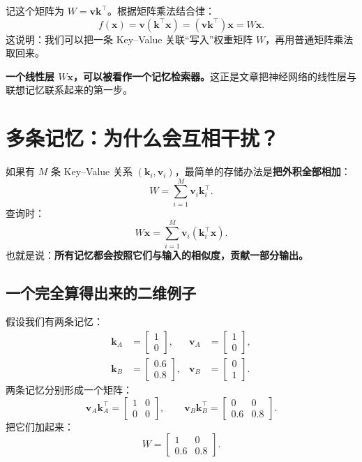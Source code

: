 \documentclass[11pt,a4paper,UTF8]{ctexart}
\numberwithin{equation}{section}
\newcommand{\vect}[1]{\boldsymbol{#1}}
\begin{document}
记这个矩阵为 $W=\vect{v}\vect{k}^\top$。根据矩阵乘法结合律：
\begin{equation}
\boxed{f(\vect{x})=\vect{v}(\vect{k}^\top\vect{x})=(\vect{v}\vect{k}^\top)\vect{x}=W\vect{x}.}
\end{equation}
这说明：我们可以把一条 Key--Value 关联“写入”权重矩阵 $W$，再用普通矩阵乘法取回来。

\begin{idea}
\textbf{一个线性层 $W\vect{x}$，可以被看作一个记忆检索器。}这正是文章把神经网络的线性层与联想记忆联系起来的第一步。
\end{idea}

\section{多条记忆：为什么会互相干扰？}

如果有 $M$ 条 Key--Value 关系 $(\vect{k}_i,\vect{v}_i)$，最简单的存储办法是\textbf{把外积全部相加}：
\begin{equation}
\boxed{W=\sum_{i=1}^{M}\vect{v}_i\vect{k}_i^\top.}
\end{equation}
查询时：
\begin{equation}
\boxed{W\vect{x}=\sum_{i=1}^{M}\vect{v}_i(\vect{k}_i^\top\vect{x}).}
\end{equation}
也就是说：\textbf{所有记忆都会按照它们与输入的相似度，贡献一部分输出。}

\subsection{一个完全算得出来的二维例子}
假设我们有两条记忆：
\begin{align*}
\vect{k}_A&=\begin{bmatrix}1\\0\end{bmatrix}, &
\vect{v}_A&=\begin{bmatrix}1\\0\end{bmatrix},\\
\vect{k}_B&=\begin{bmatrix}0.6\\0.8\end{bmatrix}, &
\vect{v}_B&=\begin{bmatrix}0\\1\end{bmatrix}.
\end{align*}
两条记忆分别形成一个矩阵：
\[
\vect{v}_A\vect{k}_A^\top=
\begin{bmatrix}1&0\\0&0\end{bmatrix},\qquad
\vect{v}_B\vect{k}_B^\top=
\begin{bmatrix}0&0\\0.6&0.8\end{bmatrix}.
\]
把它们加起来：
\begin{equation}
\boxed{W=\begin{bmatrix}1&0\\0.6&0.8\end{bmatrix}.}
\end{equation}
\end{document}
